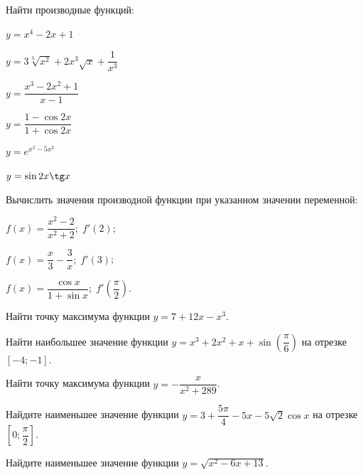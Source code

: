\begin{consultation}
	\begin{listofex}
		\item Найти производные функций:
		\begin{enumcols}[itemcolumns=2]
			\item \( y=x^4-2x+1 \)
			\item \( y=3\sqrt[3]{x^2}+2x^3\sqrt{x}+\dfrac{1}{x^3} \)
			\item \( y=\dfrac{x^3-2x^2+1}{x-1} \)
			\item \( y=\dfrac{1-\cos2x}{1+\cos2x} \)
			\item \( y=e^{x^3-5x^2} \)
			\item \( y=\sin2x\tg x \)
		\end{enumcols}
		\item Вычислить значения производной функции при указанном значении переменной:
		\begin{enumcols}[itemcolumns=3]
			\item \( f(x)=\dfrac{x^2-2}{x^2+2};\;f'(2) \);
			\item \( f(x)=\dfrac{x}{3}-\dfrac{3}{x};\;f'(3) \);
			\item \( f(x)=\dfrac{\cos x}{1+\sin x};\;f'\left( \dfrac{\pi}{2} \right) \).
		\end{enumcols}
		\item Найти точку максимума функции \( y=7+12x-x^3 \). 
		\item Найти наибольшее значение функции \( y=x^3+2x^2+x+\sin\left( \dfrac{\pi}{6} \right) \) на отрезке \( [-4;-1] \). 
		\item Найти точку максимума функции \( y=-\dfrac{x}{x^2+289} \). 
		\item Найдите наименьшее значение функции \( y=3+\dfrac{5\pi}{4}-5x-5\sqrt{2}\cos x \) на отрезке \( \left[ 0;\dfrac{\pi}{2} \right] \). 
		\item Найдите наименьшее значение функции \( y=\sqrt{x^2-6x+13} \). 
	\end{listofex}
\end{consultation}